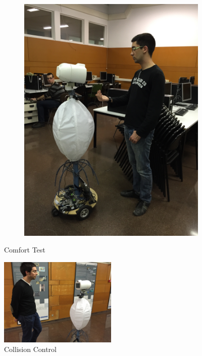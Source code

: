 \begin{figure}[htb!]
\begin{subfigure}[b]{0.3\textwidth}
		\includegraphics[width=\textwidth]{images/7_Confort_Area.jpg}
		\label{fig:comf2}
	\end{subfigure}
	\caption{Comfort Test}\label{fig:comf}
\end{figure}

\begin{figure}[htb!]
	\centering
	\includegraphics[width=0.5\textwidth]{images/5_Collision_Control.JPG}
	\caption{Collision Control}
	\label{fig:coll}
\end{figure}
